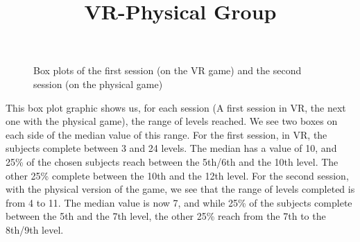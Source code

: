 \documentclass[12pt, openany, twocolumn]{article}
\begin{document}
            \noindent \title{\textbf{VR-Physical Group}}
                \begin{figure}[H]
                    \setlength{\fboxsep}{0pt}
                    \setlength{\fboxrule}{1pt}
                    \caption{Box plots of the first session (on the VR game) and the second session (on the physical game)}
                \end{figure}

            This box plot graphic shows us, for each session (A first session in VR, the next one with the physical game), the range of levels reached. We see two boxes on each side of the median value of this range.
            For the first session, in VR, the subjects complete between 3 and 24 levels. The median has a value of 10, and 25\% of the chosen subjects reach between the 5th/6th and the 10th level. The other 25\% complete between the 10th and the 12th level.
            For the second session, with the physical version of the game, we see that the range of levels completed is from 4 to 11. The median value is now 7, and while 25\% of the subjects complete between the 5th and the 7th level, the other 25\% reach from the 7th to the 8th/9th level.
\end{document}
